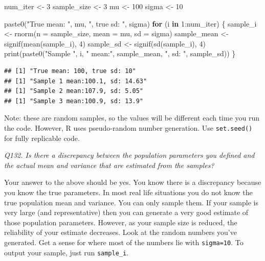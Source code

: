\documentclass[
  11pt,
  a4paper,
]{book}
\newenvironment{Shaded}{\begin{snugshade}}{\end{snugshade}}
\newcommand{\AttributeTok}[1]{\textcolor[rgb]{0.77,0.63,0.00}{#1}}
\newcommand{\ControlFlowTok}[1]{\textcolor[rgb]{0.13,0.29,0.53}{\textbf{#1}}}
\newcommand{\DecValTok}[1]{\textcolor[rgb]{0.00,0.00,0.81}{#1}}
\newcommand{\FunctionTok}[1]{\textcolor[rgb]{0.00,0.00,0.00}{#1}}
\newcommand{\NormalTok}[1]{#1}
\newcommand{\OtherTok}[1]{\textcolor[rgb]{0.56,0.35,0.01}{#1}}
\newcommand{\SpecialCharTok}[1]{\textcolor[rgb]{0.00,0.00,0.00}{#1}}
\newcommand{\StringTok}[1]{\textcolor[rgb]{0.31,0.60,0.02}{#1}}
\begin{document}
\begin{Shaded}
\begin{Highlighting}[]
\NormalTok{num\_iter }\OtherTok{\textless{}{-}} \DecValTok{3}
\NormalTok{sample\_size }\OtherTok{\textless{}{-}} \DecValTok{3}
\NormalTok{mu }\OtherTok{\textless{}{-}} \DecValTok{100}
\NormalTok{sigma }\OtherTok{\textless{}{-}} \DecValTok{10}

\FunctionTok{paste0}\NormalTok{(}\StringTok{"True mean: "}\NormalTok{, mu, }\StringTok{", true sd: "}\NormalTok{, sigma)}
\ControlFlowTok{for}\NormalTok{ (i }\ControlFlowTok{in} \DecValTok{1}\SpecialCharTok{:}\NormalTok{num\_iter) \{}
\NormalTok{  sample\_i }\OtherTok{\textless{}{-}} \FunctionTok{rnorm}\NormalTok{(}\AttributeTok{n =}\NormalTok{ sample\_size, }\AttributeTok{mean =}\NormalTok{ mu, }\AttributeTok{sd =}\NormalTok{ sigma)}
\NormalTok{  sample\_mean }\OtherTok{\textless{}{-}} \FunctionTok{signif}\NormalTok{(}\FunctionTok{mean}\NormalTok{(sample\_i), }\DecValTok{4}\NormalTok{)}
\NormalTok{  sample\_sd }\OtherTok{\textless{}{-}} \FunctionTok{signif}\NormalTok{(}\FunctionTok{sd}\NormalTok{(sample\_i), }\DecValTok{4}\NormalTok{)}
  \FunctionTok{print}\NormalTok{(}\FunctionTok{paste0}\NormalTok{(}\StringTok{"Sample "}\NormalTok{, i, }\StringTok{" mean:"}\NormalTok{, sample\_mean, }\StringTok{", sd: "}\NormalTok{, sample\_sd))}
\NormalTok{\}}
\end{Highlighting}
\end{Shaded}

\begin{verbatim}
## [1] "True mean: 100, true sd: 10"
## [1] "Sample 1 mean:100.1, sd: 14.63"
## [1] "Sample 2 mean:107.9, sd: 5.05"
## [1] "Sample 3 mean:100.9, sd: 13.9"
\end{verbatim}

Note: these are random samples, so the values will be different each time you run the code. However, R uses pseudo-random number generation. Use \texttt{set.seed()} for fully replicable code.

\emph{Q132. Is there a discrepancy between the population parameters you defined and the actual mean and variance that are estimated from the samples?}

Your answer to the above should be yes. You know there is a discrepancy because you know the true parameters. In most real life situations you do not know the true population mean and variance. You can only sample them. If your sample is very large (and representative) then you can generate a very good estimate of those population parameters. However, as your sample size is reduced, the reliability of your estimate decreases. Look at the random numbers you've generated. Get a sense for where most of the numbers lie with \texttt{sigma=10}. To output your sample, just run \texttt{sample\_i}.
\end{document}
